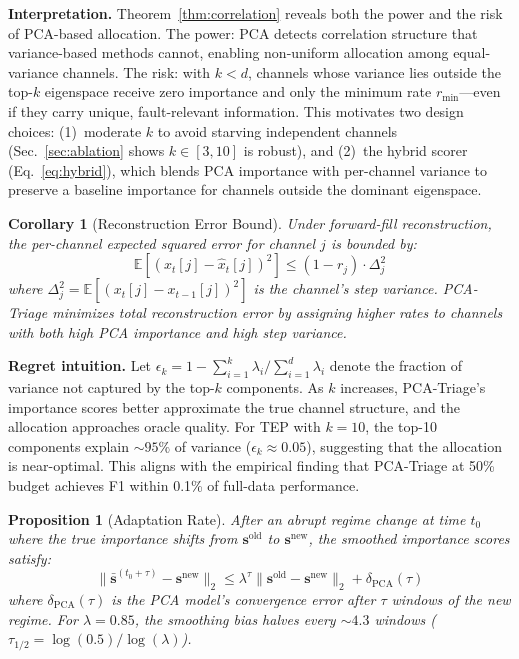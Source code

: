 \documentclass[journal]{IEEEtran}
\newtheorem{proposition}{Proposition}
\newtheorem{corollary}{Corollary}
\begin{document}
\textbf{Interpretation.} Theorem~\ref{thm:correlation} reveals both the power and the risk of PCA-based allocation. The power: PCA detects correlation structure that variance-based methods cannot, enabling non-uniform allocation among equal-variance channels. The risk: with $k < d$, channels whose variance lies outside the top-$k$ eigenspace receive zero importance and only the minimum rate $r_{\min}$---even if they carry unique, fault-relevant information. This motivates two design choices: (1)~moderate $k$ to avoid starving independent channels (Sec.~\ref{sec:ablation} shows $k \in [3, 10]$ is robust), and (2)~the hybrid scorer (Eq.~\ref{eq:hybrid}), which blends PCA importance with per-channel variance to preserve a baseline importance for channels outside the dominant eigenspace.

\begin{corollary}[Reconstruction Error Bound]
\label{cor:recon}
Under forward-fill reconstruction, the per-channel expected squared error for channel $j$ is bounded by:
\begin{equation}
\mathbb{E}[(x_t[j] - \hat{x}_t[j])^2] \leq (1 - r_j) \cdot \Delta_j^2
\end{equation}
where $\Delta_j^2 = \mathbb{E}[(x_t[j] - x_{t-1}[j])^2]$ is the channel's step variance. PCA-Triage minimizes total reconstruction error by assigning higher rates to channels with both high PCA importance \textit{and} high step variance.
\end{corollary}

\textbf{Regret intuition.} Let $\epsilon_k = 1 - \sum_{i=1}^k \lambda_i / \sum_{i=1}^d \lambda_i$ denote the fraction of variance not captured by the top-$k$ components. As $k$ increases, PCA-Triage's importance scores better approximate the true channel structure, and the allocation approaches oracle quality. For TEP with $k{=}10$, the top-10 components explain ${\sim}95\%$ of variance ($\epsilon_k \approx 0.05$), suggesting that the allocation is near-optimal. This aligns with the empirical finding that PCA-Triage at 50\% budget achieves F1 within 0.1\% of full-data performance.

\begin{proposition}[Adaptation Rate]
\label{prop:adaptation}
After an abrupt regime change at time $t_0$ where the true importance shifts from $\mathbf{s}^{\text{old}}$ to $\mathbf{s}^{\text{new}}$, the smoothed importance scores satisfy:
\begin{equation}
\|\bar{\mathbf{s}}^{(t_0 + \tau)} - \mathbf{s}^{\text{new}}\|_2 \leq \lambda^\tau \|\mathbf{s}^{\text{old}} - \mathbf{s}^{\text{new}}\|_2 + \delta_{\text{PCA}}(\tau)
\end{equation}
where $\delta_{\text{PCA}}(\tau)$ is the PCA model's convergence error after $\tau$ windows of the new regime. For $\lambda = 0.85$, the smoothing bias halves every ${\sim}4.3$ windows ($\tau_{1/2} = \log(0.5) / \log(\lambda)$).
\end{proposition}
\end{document}

